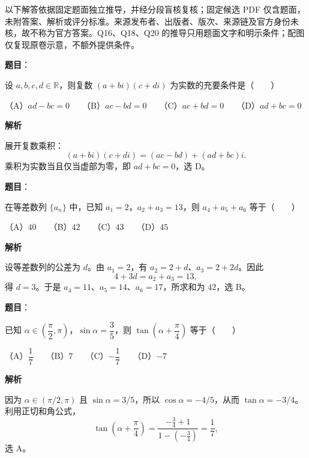 

\begin{gktip}
以下解答依据固定题面独立推导，并经分段盲核复核；固定候选 PDF 仅含题面，未附答案、解析或评分标准。来源发布者、出版者、版次、来源链及官方身份未核，故不称为官方答案。Q16、Q18、Q20 的推导只用题面文字和明示条件；配图仅复现原卷示意，不额外提供条件。
\end{gktip}

\begin{answer}

\textbf{题目}：

设 $a,b,c,d\in\mathbb R$，则复数 $(a+bi)(c+di)$ 为实数的充要条件是\mbox{（　　）}

（A）$ad-bc=0$　　（B）$ac-bd=0$　　（C）$ac+bd=0$　　（D）$ad+bc=0$

\textbf{解析}

展开复数乘积：
\nopagebreak[4]
\[
(a+bi)(c+di)=(ac-bd)+(ad+bc)i.
\]
乘积为实数当且仅当虚部为零，即 $ad+bc=0$，选 D。


\end{answer}
\begin{answer}

\textbf{题目}：

在等差数列 $\{a_n\}$ 中，已知 $a_1=2$，$a_2+a_3=13$，则 $a_4+a_5+a_6$ 等于\mbox{（　　）}

（A）$40$　　（B）$42$　　（C）$43$　　（D）$45$

\textbf{解析}

设等差数列的公差为 $d$。由 $a_1=2$，有 $a_2=2+d$、$a_3=2+2d$。因此
\nopagebreak[4]
\[
4+3d=a_2+a_3=13,
\]
得 $d=3$。于是 $a_4=11$、$a_5=14$、$a_6=17$，所求和为 $42$，选 B。


\end{answer}
\begin{answer}

\textbf{题目}：

已知 $\alpha\in\left(\dfrac{\pi}{2},\pi\right)$，$\sin\alpha=\dfrac35$，则 $\tan\left(\alpha+\dfrac\pi4\right)$ 等于\mbox{（　　）}

（A）$\dfrac17$　　（B）$7$　　（C）$-\dfrac17$　　（D）$-7$

\textbf{解析}

因为 $\alpha\in(\pi/2,\pi)$ 且 $\sin\alpha=3/5$，所以 $\cos\alpha=-4/5$，从而 $\tan\alpha=-3/4$。利用正切和角公式，
\nopagebreak[4]
\[
\tan\left(\alpha+\frac\pi4\right)
=\frac{-\frac34+1}{1-(-\frac34)}=\frac17,
\]
选 A。


\end{answer}
